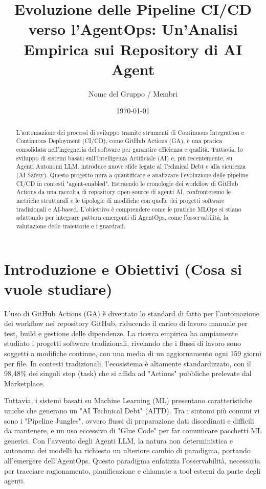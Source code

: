 \documentclass[a4paper,11pt]{article}
\title{\textbf{Evoluzione delle Pipeline CI/CD verso l'AgentOps: Un'Analisi Empirica sui Repository di AI Agent}}
\author{Nome del Gruppo / Membri}
\date{\today}
\begin{document}
\maketitle

\begin{abstract}
L'automazione dei processi di sviluppo tramite strumenti di Continuous Integration e Continuous Deployment (CI/CD), come GitHub Actions (GA), è una pratica consolidata nell'ingegneria del software per garantire efficienza e qualità. Tuttavia, lo sviluppo di sistemi basati sull'Intelligenza Artificiale (AI) e, più recentemente, su Agenti Autonomi LLM, introduce nuove sfide legate al Technical Debt e alla sicurezza (AI Safety). Questo progetto mira a quantificare e analizzare l'evoluzione delle pipeline CI/CD in contesti "agent-enabled". Estraendo le cronologie dei workflow di GitHub Actions da una raccolta di repository open-source di agenti AI, confronteremo le metriche strutturali e le tipologie di modifiche con quelle dei progetti software tradizionali e AI-based. L'obiettivo è comprendere come le pratiche MLOps si stiano adattando per integrare pattern emergenti di AgentOps, come l'osservabilità, la valutazione delle traiettorie e i guardrail.
\end{abstract}

\section{Introduzione e Obiettivi (Cosa si vuole studiare)}
L'uso di GitHub Actions (GA) è diventato lo standard di fatto per l'automazione dei workflow nei repository GitHub, riducendo il carico di lavoro manuale per test, build e gestione delle dipendenze. La ricerca empirica ha ampiamente studiato i progetti software tradizionali, rivelando che i flussi di lavoro sono soggetti a modifiche continue, con una media di un aggiornamento ogni 159 giorni per file. In contesti tradizionali, l'ecosistema è altamente standardizzato, con il 98,48\% dei singoli step (task) che si affida ad "Actions" pubbliche prelevate dal Marketplace.

Tuttavia, i sistemi basati su Machine Learning (ML) presentano caratteristiche uniche che generano un "AI Technical Debt" (AITD). Tra i sintomi più comuni vi sono i "Pipeline Jungles", ovvero flussi di preparazione dati disordinati e difficili da mantenere, e un uso eccessivo di "Glue Code" per far comunicare pacchetti ML generici. Con l'avvento degli Agenti LLM, la natura non deterministica e autonoma dei modelli ha richiesto un ulteriore cambio di paradigma, portando all'emergere dell'AgentOps. Questo paradigma enfatizza l'osservabilità, necessaria per tracciare ragionamento, pianificazione e chiamate a tool esterni da parte degli agenti.
\end{document}
